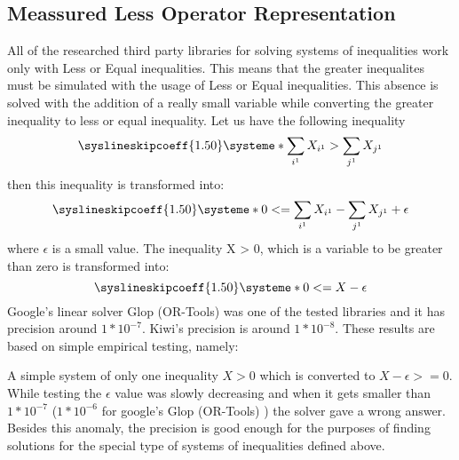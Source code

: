 \documentclass{article}
\begin{document}
		\subsection{Meassured Less Operator Representation}
		All of the researched third party libraries for solving systems of inequalities work only with Less or Equal inequalities.
		This means that the greater inequalites must be simulated with the usage of Less or Equal inequalities.
		\newline
		This absence is solved with the addition of a really small variable while converting the greater inequality to 
		less or equal inequality.
		\newline
		Let us have the following inequality
		\[
			\syslineskipcoeff{1.50}
			\systeme*{\sum_{i^1} X_{i^1} > \sum_{j^1} X_{j^1}}
		\]
		then this inequality is transformed into:
		\[
			\syslineskipcoeff{1.50}
			\systeme*{0 <= \sum_{i^1} X_{i^1} - \sum_{j^1} X_{j^1}} + \epsilon
		\]
		where $\epsilon$ is a small value.
		\newline
		The inequality X > 0, which is a variable to be greater than zero is transformed into:
		\[
			\syslineskipcoeff{1.50}
			\systeme*{0 <= X - \epsilon} 
		\]
		\newline
		Google's linear solver Glop (OR-Tools) was one of the tested libraries and it has precision around $1*10^{-7}$.
		Kiwi's precision is around $1*10^{-8}$. 
		\newline
		These results are based on simple empirical testing, namely:

		A simple system of only one inequality $X > 0$ which is converted to $X - \epsilon >= 0$. 
		While testing the $\epsilon$ value was slowly decreasing and when it gets smaller than $1*10^{-7}$
		($1*10^{-6}$ for google's Glop (OR-Tools) ) the solver gave a wrong answer.
		\newline
		\newline
		Besides this anomaly, the precision is good enough for the purposes of finding solutions for the special type
		of systems of inequalities defined above.
\end{document}

